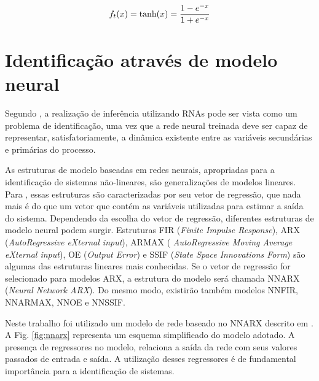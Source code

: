 
\begin{equation}
\label{eq:tan}
f_t(x) = \text{tanh}(x) = \frac{1-e^{-x}}{1+e^{-x}}\\
\end{equation}


\section{Identificação através de modelo neural}
Segundo , a realização de inferência utilizando RNAs
pode ser vista como um problema de identificação, uma vez que a rede neural
treinada deve ser capaz de representar, satisfatoriamente, a dinâmica existente
entre as variáveis secundárias e primárias do processo.

As estruturas de modelo baseadas em redes neurais, apropriadas para a
identificação de sistemas não-lineares, são generalizações de modelos lineares.
Para , essas estruturas são caracterizadas por seu vetor
de regressão, que nada mais é do que um vetor que contém as variáveis utilizadas
para estimar a saída do sistema. Dependendo da escolha do vetor de regressão,
diferentes estruturas de modelo neural podem surgir. Estruturas FIR ({\it Finite
Impulse Response}), ARX ({\it AutoRegressive eXternal input}), ARMAX ({\it
AutoRegressive Moving Average eXternal input}), OE ({\it Output Error}) e SSIF
({\it State Space Innovations Form}) são algumas das estruturas lineares mais
conhecidas. Se o vetor de regressão for selecionado para modelos ARX, a
estrutura do modelo será chamada NNARX ({\it Neural Network ARX}). Do mesmo
modo, existirão também modelos NNFIR, NNARMAX, NNOE e NNSSIF.


Neste trabalho foi utilizado um modelo de rede baseado no NNARX descrito em
. A Fig. \ref{fig:nnarx} representa um esquema
simplificado do modelo adotado. A presença de regressores no modelo, relaciona a
saída da rede com seus valores passados de entrada e saída. A utilização desses
regressores é de fundamental importância para a identificação de sistemas.

